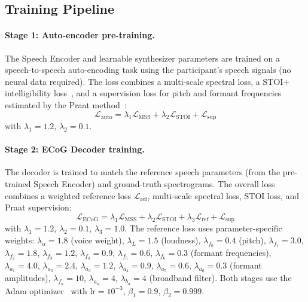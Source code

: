 \documentclass[11pt]{article}
\begin{document}
\subsection{Training Pipeline}

\paragraph{Stage 1: Auto-encoder pre-training.} The Speech Encoder and learnable synthesizer parameters are trained on a speech-to-speech auto-encoding task using the participant's speech signals (no neural data required). The loss combines a multi-scale spectral loss, a STOI+ intelligibility loss~\citep{taal2011algorithm, jensen2016algorithm}, and a supervision loss for pitch and formant frequencies estimated by the Praat method~\citep{boersma2023praat}:
\begin{equation}
    \mathcal{L}_{\text{auto}} = \lambda_1 \mathcal{L}_{\text{MSS}} + \lambda_2 \mathcal{L}_{\text{STOI}} + \mathcal{L}_{\text{sup}}
\end{equation}
with $\lambda_1=1.2$, $\lambda_2=0.1$.

\paragraph{Stage 2: ECoG Decoder training.} The decoder is trained to match the reference speech parameters (from the pre-trained Speech Encoder) and ground-truth spectrograms. The overall loss combines a weighted reference loss $\mathcal{L}_{\text{ref}}$, multi-scale spectral loss, STOI loss, and Praat supervision:
\begin{equation}
    \mathcal{L}_{\text{ECoG}} = \lambda_1 \mathcal{L}_{\text{MSS}} + \lambda_2 \mathcal{L}_{\text{STOI}} + \lambda_3 \mathcal{L}_{\text{ref}} + \mathcal{L}_{\text{sup}}
\end{equation}
with $\lambda_1=1.2$, $\lambda_2=0.1$, $\lambda_3=1.0$. The reference loss uses parameter-specific weights: $\lambda_\alpha=1.8$ (voice weight), $\lambda_L=1.5$ (loudness), $\lambda_{f_0}=0.4$ (pitch), $\lambda_{f_1}=3.0$, $\lambda_{f_2}=1.8$, $\lambda_{f_3}=1.2$, $\lambda_{f_4}=0.9$, $\lambda_{f_5}=0.6$, $\lambda_{f_6}=0.3$ (formant frequencies), $\lambda_{a_1}=4.0$, $\lambda_{a_2}=2.4$, $\lambda_{a_3}=1.2$, $\lambda_{a_4}=0.9$, $\lambda_{a_5}=0.6$, $\lambda_{a_6}=0.3$ (formant amplitudes), $\lambda_{f_u}=10$, $\lambda_{a_u}=4$, $\lambda_{b_u}=4$ (broadband filter). Both stages use the Adam optimizer~\citep{kingma2015adam} with $\text{lr}=10^{-3}$, $\beta_1=0.9$, $\beta_2=0.999$.
\end{document}
